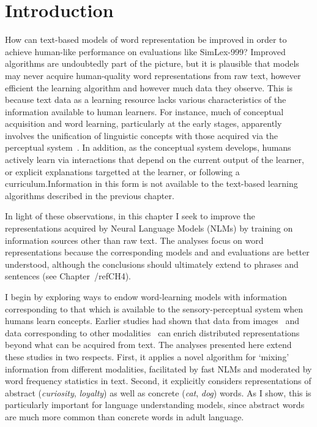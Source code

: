
\section{Introduction}

How can text-based models of word representation be improved in order to achieve human-like performance on evaluations like SimLex-999? Improved algorithms are undoubtedly part of the picture, but it is plausible that models may never acquire human-quality word representations from raw text, however efficient the learning algorithm and however much data they observe. This is because text data as a learning resource lacks various characteristics of the information available to human learners. For instance, much of conceptual acquisition and word learning, particularly at the early stages, apparently involves the unification of linguistic concepts with those acquired via the perceptual system~\citep{barsalou2005situating}. In addition, as the conceptual system develops, humans actively learn via interactions that depend on the current output of the learner, or explicit explanations targetted at the learner, or following a curriculum.Information in this form is not available to the text-based learning algorithms described in the previous chapter. 

In light of these observations, in this chapter I seek to improve the representations acquired by Neural Language Models (NLMs) by training on information sources other than raw text. The analyses focus on word representations because the corresponding models and  and evaluations are better understood, although the conclusions should ultimately extend to phrases and sentences (see Chapter~/ref{CH4}).

 I begin by exploring ways to endow word-learning models with information corresponding to that which is available to the sensory-perceptual system when humans learn concepts. Earlier studies had shown that data from images~\citep{feng2010visual,bruni2012distributional} and data corresponding to other modalities~\cite{kiela2015multi} can enrich distributed representations beyond what can be acquired from text. The analyses presented here extend these studies in two respects. First, it applies a novel algorithm for `mixing' information from different modalities, facilitated by fast NLMs and moderated by word frequency statistics in text. Second, it explicitly considers representations of abstract  (\emph{curiosity}, \emph{loyalty}) as well as concrete (\emph{cat}, \emph{dog}) words. As I show, this is particularly important for language understanding models, since abstract words are much more common than concrete words in adult language. 

